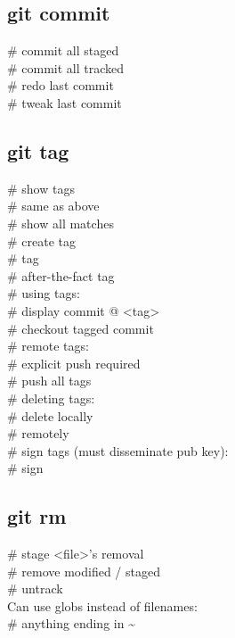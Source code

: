 \subsection*{git commit}
 \# commit all staged \\
 \# commit all tracked \\
 \# redo last commit \\
 \# tweak last commit \\

\subsection*{git tag}
 \# show tags \\
 \# same as above\\
 \# show all matches \\
 \# create  tag \\
 \#  tag \\
 \# after-the-fact tag \\
\# using tags:\\
 \# display commit @ <tag>\\
 \# checkout tagged commit \\
\# remote tags:\\
 \# explicit push required \\
 \# push all tags \\
\# deleting tags: \\
 \# delete locally \\
 \# remotely \\
\# sign tags (must disseminate pub key): \\
 \# sign\\

\subsection*{git rm}
 \# stage <file>'s removal \\
 \# remove modified / staged \\
 \# untrack \\
Can use globs instead of filenames:\\
 \# anything ending in \textasciitilde \\

